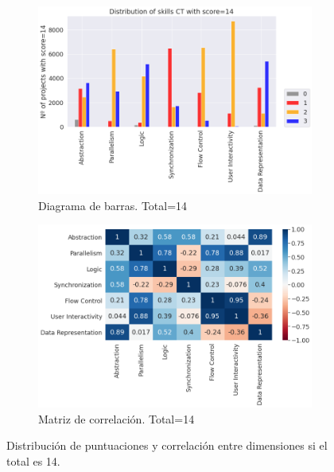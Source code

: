 \documentclass[a4paper, 12pt]{book}
\begin{document}
\begin{figure}[H]
    \centering
    \begin{subfigure}[h]{.49\textwidth} 
        \includegraphics[width=\textwidth]{img/distribucion_14_Scratch}
        \caption{Diagrama de barras. Total=14}
        \label{fig:total14}
    \end{subfigure}       
    \begin{subfigure}[h]{.49\textwidth} 
        \includegraphics[width=\textwidth]{img/corr_14_Scratch}
        \caption{Matriz de correlación. Total=14}
        \label{fig:corr14}
    \end{subfigure}
     \caption{Distribución de puntuaciones y correlación entre dimensiones si el total es 14.}
\end{figure}
\end{document}
